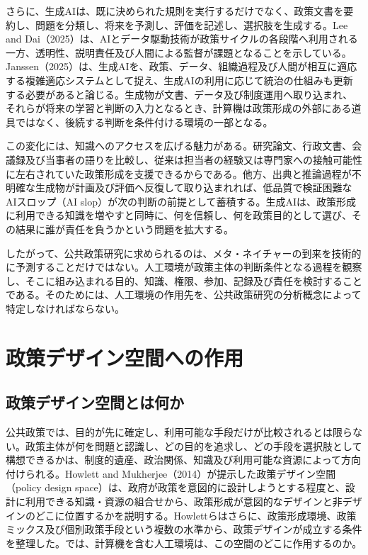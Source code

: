さらに、生成AIは、既に決められた規則を実行するだけでなく、政策文書を要約し、問題を分類し、将来を予測し、評価を記述し、選択肢を生成する。Lee and Dai（2025）は、AIとデータ駆動技術が政策サイクルの各段階へ利用される一方、透明性、説明責任及び人間による監督が課題となることを示している\cite{lee2025ai_policy_cycle}。Janssen（2025）は、生成AIを、政策、データ、組織過程及び人間が相互に適応する複雑適応システムとして捉え、生成AIの利用に応じて統治の仕組みも更新する必要があると論じる\cite{janssen2025genaicas}。生成物が文書、データ及び制度運用へ取り込まれ、それらが将来の学習と判断の入力となるとき、計算機は政策形成の外部にある道具ではなく、後続する判断を条件付ける環境の一部となる。

この変化には、知識へのアクセスを広げる魅力がある。研究論文、行政文書、会議録及び当事者の語りを比較し、従来は担当者の経験又は専門家への接触可能性に左右されていた政策形成を支援できるからである。他方、出典と推論過程が不明確な生成物が計画及び評価へ反復して取り込まれれば、低品質で検証困難なAIスロップ（AI slop）が次の判断の前提として蓄積する\cite{cambridgeaislop2026}。生成AIは、政策形成に利用できる知識を増やすと同時に、何を信頼し、何を政策目的として選び、その結果に誰が責任を負うかという問題を拡大する。

したがって、公共政策研究に求められるのは、メタ・ネイチャーの到来を技術的に予測することだけではない。人工環境が政策主体の判断条件となる過程を観察し、そこに組み込まれる目的、知識、権限、参加、記録及び責任を検討することである。そのためには、人工環境の作用先を、公共政策研究の分析概念によって特定しなければならない。

\section{政策デザイン空間への作用}
\label{sec:intro_policy_design_space}

\subsection{政策デザイン空間とは何か}
\label{subsec:intro_design_space_definition}

公共政策では、目的が先に確定し、利用可能な手段だけが比較されるとは限らない。政策主体が何を問題と認識し、どの目的を追求し、どの手段を選択肢として構想できるかは、制度的遺産、政治関係、知識及び利用可能な資源によって方向付けられる。Howlett and Mukherjee（2014）が提示した政策デザイン空間（policy design space）は、政府が政策を意図的に設計しようとする程度と、設計に利用できる知識・資源の組合せから、政策形成が意図的なデザインと非デザインのどこに位置するかを説明する\cite{howlett2014policydesign}。Howlettらはさらに、政策形成環境、政策ミックス及び個別政策手段という複数の水準から、政策デザインが成立する条件を整理した\cite{howlett2018designspaces}。では、計算機を含む人工環境は、この空間のどこに作用するのか。


